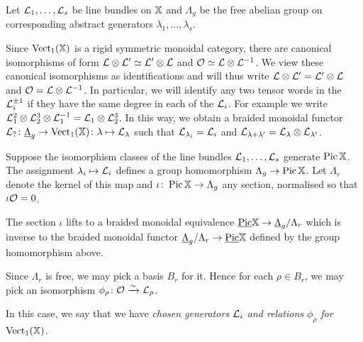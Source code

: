 \documentclass[12pt]{amsart}
\begin{document}
Let $\mathcal{L}_1, \ldots, \mathcal{L}_s$ be line bundles on $\mathbb{X}$ and $\Lambda_g$ be the free abelian group on corresponding abstract generators $\lambda_1,\ldots, \lambda_s$.

\begin{remark}  \label{rem:wordsinLis}
Since $\operatorname{Vect}_1(\mathbb{X})$ is a rigid symmetric monoidal category, there are canonical isomorphisms of form $\mathcal{L} \otimes \mathcal{L}' \simeq \mathcal{L}' \otimes \mathcal{L}$ and $\mathcal{O} \simeq \mathcal{L} \otimes \mathcal{L}^{-1}$. We view these canonical isomorphisms as identifications and will thus write $\mathcal{L} \otimes \mathcal{L}' = \mathcal{L}' \otimes \mathcal{L}$ and $\mathcal{O} = \mathcal{L} \otimes \mathcal{L}^{-1}$. In particular, we will identify any two tensor words in the $\mathcal{L}_i^{\pm 1}$ if they have the same degree in each of the $\mathcal{L}_i$. For example we write $\mathcal{L}_1^2 \otimes \mathcal{L}_2^3 \otimes \mathcal{L}_1^{-1} = \mathcal{L}_1 \otimes \mathcal{L}_2^3$. In this way, we obtain a braided monoidal functor $\mathcal{L}_? \colon \underline{\Lambda}_g \to \operatorname{Vect}_1(\mathbb{X}) \colon \lambda \mapsto \mathcal{L}_{\lambda}$ such that $\mathcal{L}_{\lambda_i} = \mathcal{L}_i$ and $\mathcal{L}_{\lambda + \lambda'}  = \mathcal{L}_{\lambda} \otimes \mathcal{L}_{\lambda'}$. 
\end{remark}

Suppose the isomorphism classes of the line bundles $\mathcal{L}_1, \ldots, \mathcal{L}_s$ generate $\operatorname{Pic} \mathbb{X}$.  The assignment $\lambda_i \mapsto \mathcal{L}_i$ defines a group homomorphism $\Lambda_g \to \operatorname{Pic} \mathbb{X}$. Let $\Lambda_r$ denote the kernel of this map and $\iota \colon \operatorname{Pic} \mathbb{X} \to \Lambda_g$ any section, normalised so that $\iota \mathcal{O} = 0$. 

\begin{proposition} \label{prop:vect1X}
The section $\iota$ lifts to a braided monoidal equivalence $\underline{\operatorname{Pic}} \mathbb{X} \to \underline{\Lambda}_g / \Lambda_r$ which is inverse to the braided monoidal functor $\underline{\Lambda}_g / \Lambda_r \to \underline{\operatorname{Pic}} \mathbb{X}$ defined by the group homomorphism above. 
\end{proposition}

Since $\Lambda_r$ is free, we may pick a basis $B_r$ for it. Hence for each $\rho \in B_r$, we may pick an isomorphism $\phi_{\rho} \colon \mathcal{O} \xrightarrow{\sim} \mathcal{L}_{\rho}$. 

\begin{definition} \label{def:genrelVect}
In this case, we say that we have {\em chosen generators $\mathcal{L}_i$ and relations $\phi_{\rho}$ for $\operatorname{Vect}_1(\mathbb{X})$}.  
\end{definition}
\end{document}
